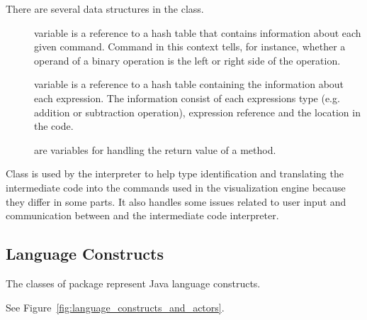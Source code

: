 There are several data structures in the  class.
\begin{description}
\item[] variable is a reference to a hash table that contains information about each given command. Command in this context tells, for instance, whether a operand of a binary operation is the left or right side of the operation.
\item[] variable is a reference to a hash table containing the information about each expression. The information consist of each expressions type (e.g. addition or subtraction operation), expression reference and the location in the code.
\item[]
\item[]
\item[]
\item[]
\item[]
\item[]
\item[]
\item[] 
\item[]
\item[] are variables for handling the return value of a method.
\end{description}

Class  is used by the interpreter to help type identification and
translating the intermediate code into the commands used in the visualization engine because they differ in some parts. It also handles some issues related to user input
and communication between \djava{} and the intermediate code interpreter. 

\subsection{Language Constructs}
\label{sec:Language_package}

The classes of  package represent Java language constructs.

See Figure~\ref{fig:language_constructs_and_actors}.

